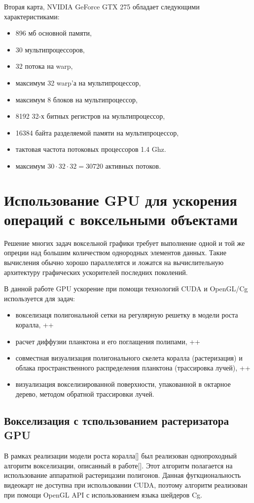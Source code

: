 Вторая карта, NVIDIA GeForce GTX 275 обладает следующими характеристиками:
 \begin{itemize}
\item 896 мб основной памяти,
\item 30 мультипроцессоров,
\item 32 потока на warp,
\item максимум 32 warp'а на мультипроцессор,
\item максимум 8 блоков на мультипроцессор,
\item 8192 32-х битных регистров на мультипроцессор,
\item 16384 байта разделяемой памяти на мультипроцессор,
\item тактовая частота потоковых процессоров 1.4 Ghz.
\item максимум $30 \cdot 32\cdot 32 = 30720$ активных потоков.
 \end{itemize}

\section{Использование GPU для ускорения операций с воксельными объектами}

Решение многих задач воксельной графики требует выполнение одной и той же опреции над большим количеством однородных элементов данных. Такие вычисления обычно хорошо параллелятся и ложатся на вычислительную архитектуру графических ускорителей последних поколений.

В данной работе GPU ускорение при помощи технологий CUDA и OpenGL/Cg используется для задач:
\begin{itemize}
\item вокселизаця полигональной сетки на регулярную решетку в модели роста коралла, ++
\item расчет диффузии планктона и его поглащения полипами, ++
\item совместная визуализация полигонального скелета коралла (растеризация) и облака пространственного распределения планктона (трассировка лучей), ++
\item визуализация вокселизированной поверхности, упакованной в октарное дерево, методом обратной трассировки лучей.
\end{itemize}

\subsection{Вокселизация с тспользованием растеризатора GPU}
В рамках реализации модели роста коралла[] был реализован однопроходный алгоритм вокселизации, описанный в работе[]. Этот алгоритм полагается на использование аппаратной растерицазии полигонов. Данная фугкциональность видеокарт не доступна при использовании CUDA, поэтому алгоритм реализован при помощи OpenGL API с использованием языка шейдеров Cg.

